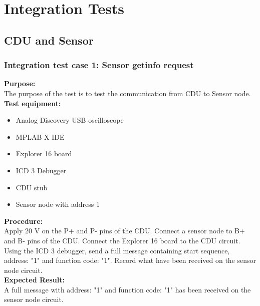 \chapter{Integration Tests}

\section{CDU and Sensor}
\subsection{Integration test case 1: Sensor getinfo request}
\textbf{Purpose:}\\
The purpose of the test is to test the communication from CDU to Sensor node.\\

\textbf{Test equipment:}
\begin{itemize}
\item Analog Discovery USB oscilloscope
\item MPLAB X IDE
\item Explorer 16 board
\item ICD 3 Debugger
\item CDU stub
\item Sensor node with address 1
\end{itemize}

\textbf{Procedure:}\\
Apply 20 V on the P+ and P- pins of the CDU. Connect a sensor node to B+ and B- pins of the CDU. Connect the Explorer 16 board to the CDU circuit. Using the ICD 3 debugger, send a full message containing start sequence, address: "1" and function code: "1". Record what have been received on the sensor node circuit.\\

\textbf{Expected Result:}\\
A full message with address: "1" and function code: "1" has been received on the sensor node circuit.\\

